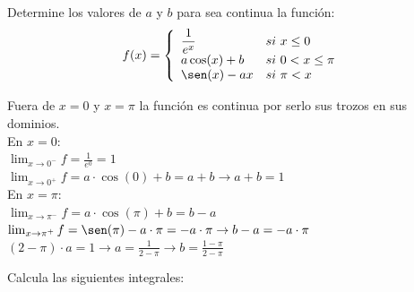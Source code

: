 \documentclass[addpoints,spanish, 12pt,a4paper]{exam}
\begin{document}
\begin{questions}

%
%
%

\question[1] Determine los valores de $a$ y $b$ para sea
continua la función:
$$f(x)=\left\{\begin{array}{ll}
\dfrac{1}{e^x} & si \ x\leq 0 \\
a\cos(x) + b & si \  0 < x \leq \pi \\
\sen(x)-ax & si \ \pi<x
\end{array}\right.$$
\begin{solution}
Fuera de $x=0$ y $x=\pi$ la función es continua por serlo sus trozos en sus dominios. \\

En $x=0$: \\
$\lim_{x \to 0^-}f=\frac{1}{e^0}=1$\\
$\lim_{x \to 0^+}f=a\cdot \cos(0) +b =a+b \to a+b=1$\\

En $x=\pi$: \\
$\lim_{x \to \pi^-}f=a\cdot \cos(\pi) +b =b-a$\\
$\lim_{x \to \pi^+}f=\sen(\pi) - a\cdot \pi =- a\cdot \pi \to b-a=-a\cdot \pi$\\

$(2-\pi)\cdot a= 1 \to a=\frac{1}{2- \pi} \to b=\frac{1-\pi}{2-\pi}$

\end{solution}

\question Calcula las siguientes integrales:
\end{questions}
\end{document}
